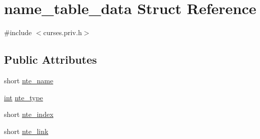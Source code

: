 \hypertarget{structname__table__data}{\section{name\-\_\-table\-\_\-data Struct Reference}
\label{structname__table__data}
}


{\ttfamily \#include $<$curses.\-priv.\-h$>$}

\subsection*{Public Attributes}
\begin{DoxyCompactItemize}
\item 
short \hyperlink{structname__table__data_a312ad70ad13d267ef7cd269606929b31}{nte\-\_\-name}
\item 
\hyperlink{term__entry_8h_ad65b480f8c8270356b45a9890f6499ae}{int} \hyperlink{structname__table__data_a990f7e4e33c021d319c461d52358e0df}{nte\-\_\-type}
\item 
short \hyperlink{structname__table__data_a8d7c7c4823598c75022d5a7a61a64816}{nte\-\_\-index}
\item 
short \hyperlink{structname__table__data_ab94e94df70acd457828ac46c92e1e089}{nte\-\_\-link}
\end{DoxyCompactItemize}


